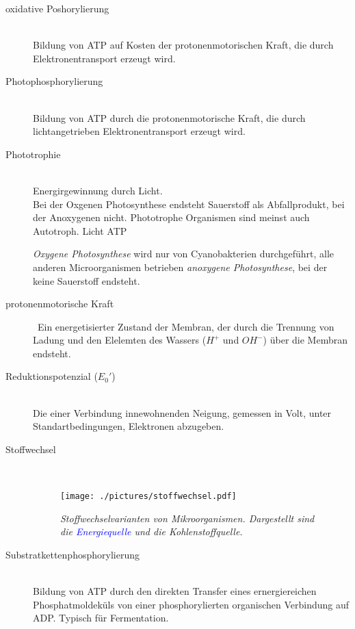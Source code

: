 \begin{description}
	\item[oxidative Poshorylierung] \hfill \\
		Bildung von ATP auf Kosten der protonenmotorischen Kraft,
		die durch Elektronentransport erzeugt wird.

	\item[Photophosphorylierung] \hfill \\
		Bildung von ATP durch die protonenmotorische Kraft,
		die durch lichtangetrieben Elektronentransport erzeugt wird.

	\item[Phototrophie]\hfill \\
		Energirgewinnung durch Licht.\\
		Bei der Oxgenen Photosynthese endsteht Sauerstoff als Abfallprodukt,
		bei der Anoxygenen nicht.
		Phototrophe Organismen sind meinst auch Autotroph.
		Licht \textrightarrow ATP

		\emph{Oxygene Photosynthese} wird nur von Cyanobakterien durchgeführt,
		alle anderen Microorganismen betrieben \emph{anoxygene Photosynthese},
		bei der keine Sauerstoff endsteht.

	\item[protonenmotorische Kraft] 	\hfill	\
		Ein energetisierter Zustand der Membran,
		der durch die Trennung von Ladung und den Elelemten des Wassers
		($H^+$ und  $OH^-$) über die Membran endsteht.

	\item[Reduktionspotenzial ($E_0'$)] \hfill \\
		Die einer Verbindung innewohnenden Neigung,
		gemessen in Volt,
		unter Standartbedingungen,
		Elektronen abzugeben.

	 \item[Stoffwechsel] \hfill \\

		\begin{figure}[ht!]
		\leavevmode
		\begin{center}
		\texttt{[image: ./pictures/stoffwechsel.pdf]}
		\end{center}
		\caption{\slshape{Stoffwechselvarianten von Mikroorganismen.
								Dargestellt sind die \textcolor{blue}{Energiequelle} und die Kohlenstoffquelle.}}
		\label{fig:Stoffwechselvarianten}
		\end{figure}

	\item[Substratkettenphosphorylierung]	\hfill	\\
		Bildung von ATP durch den direkten Transfer eines ernergiereichen
		Phosphatmoldeküls von einer phosphorylierten organischen Verbindung
		auf ADP.
		Typisch für Fermentation.
\end{description}
